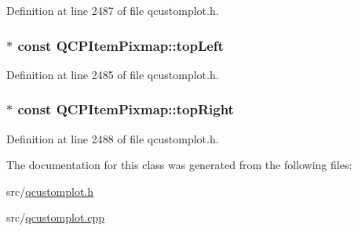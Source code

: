 Definition at line 2487 of file qcustomplot.\-h.

\hypertarget{class_q_c_p_item_pixmap_a43c281ef6ad46f3cf04f365289abe51a}{
\subsubsection[{top\-Left}]{$\ast$ const Q\-C\-P\-Item\-Pixmap\-::top\-Left}}\label{class_q_c_p_item_pixmap_a43c281ef6ad46f3cf04f365289abe51a}


Definition at line 2485 of file qcustomplot.\-h.

\hypertarget{class_q_c_p_item_pixmap_a72eabd0010be41a4ec1b22aa983d2aa1}{
\subsubsection[{top\-Right}]{$\ast$ const Q\-C\-P\-Item\-Pixmap\-::top\-Right}}\label{class_q_c_p_item_pixmap_a72eabd0010be41a4ec1b22aa983d2aa1}


Definition at line 2488 of file qcustomplot.\-h.



The documentation for this class was generated from the following files\-:\begin{DoxyCompactItemize}
\item 
src/\hyperlink{qcustomplot_8h}{qcustomplot.\-h}\item 
src/\hyperlink{qcustomplot_8cpp}{qcustomplot.\-cpp}\end{DoxyCompactItemize}
